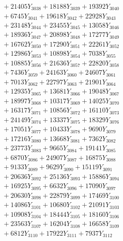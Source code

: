 \documentclass[a4paper,10pt]{article}
\begin{document}
{\begin{align}
&\;  + 21405 Y_{3038} + 18188 Y_{3039} + 19392 Y_{3040} \\[0.3ex]
&\;  + 6745 Y_{3041} + 19618 Y_{3042} + 22928 Y_{3043} \\[0.3ex]
&\;  + 23148 Y_{3044} + 23455 Y_{3045} + 13058 Y_{3046} \\[0.3ex]
&\;  + 18936 Y_{3047} + 20898 Y_{3048} + 17277 Y_{3049} \\[0.3ex]
&\;  + 16762 Y_{3050} + 17290 Y_{3051} + 22261 Y_{3052} \\[0.3ex]
&\;  + 12986 Y_{3053} + 10898 Y_{3054} + 7038 Y_{3055} \\[0.3ex]
&\;  + 10885 Y_{3056} + 21636 Y_{3057} + 22820 Y_{3058} \\[0.5ex]\allowbreak
&\;  + 7436 Y_{3059} + 24163 Y_{3060} + 24607 Y_{3061} \\[0.3ex]
&\;  + 7013 Y_{3062} + 22797 Y_{3063} + 21901 Y_{3064} \\[0.3ex]
&\;  + 12935 Y_{3065} + 13681 Y_{3066} + 19048 Y_{3067} \\[0.3ex]
&\;  + 18997 Y_{3068} + 10317 Y_{3069} + 14025 Y_{3070} \\[0.3ex]
&\;  + 16317 Y_{3071} + 10856 Y_{3072} + 16110 Y_{3073} \\[0.3ex]
&\;  + 24149 Y_{3074} + 13337 Y_{3075} + 18329 Y_{3076} \\[0.3ex]
&\;  + 17051 Y_{3077} + 10433 Y_{3078} + 9690 Y_{3079} \\[0.3ex]
&\;  + 17216 Y_{3080} + 13668 Y_{3081} + 7362 Y_{3082} \\[0.3ex]
&\;  + 23773 Y_{3083} + 9665 Y_{3084} + 19141 Y_{3085} \\[0.3ex]
&\;  + 6870 Y_{3086} + 24907 Y_{3087} + 16875 Y_{3088} \\[0.5ex]\allowbreak
&\;  + 9133 Y_{3089} + 9629 Y_{3090} + 15119 Y_{3091} \\[0.3ex]
&\;  + 20636 Y_{3092} + 25136 Y_{3093} + 15886 Y_{3094} \\[0.3ex]
&\;  + 16925 Y_{3095} + 6632 Y_{3096} + 17090 Y_{3097} \\[0.3ex]
&\;  + 20630 Y_{3098} + 22879 Y_{3099} + 17469 Y_{3100} \\[0.3ex]
&\;  + 14086 Y_{3101} + 10680 Y_{3102} + 21091 Y_{3103} \\[0.3ex]
&\;  + 10908 Y_{3104} + 18444 Y_{3105} + 18160 Y_{3106} \\[0.3ex]
&\;  + 23563 Y_{3107} + 16204 Y_{3108} + 16658 Y_{3109} \\[0.3ex]
&\;  + 6812 Y_{3110} + 17922 Y_{3111} + 7937 Y_{3112} \\[0.3ex]

\end{align}}
\end{document}
